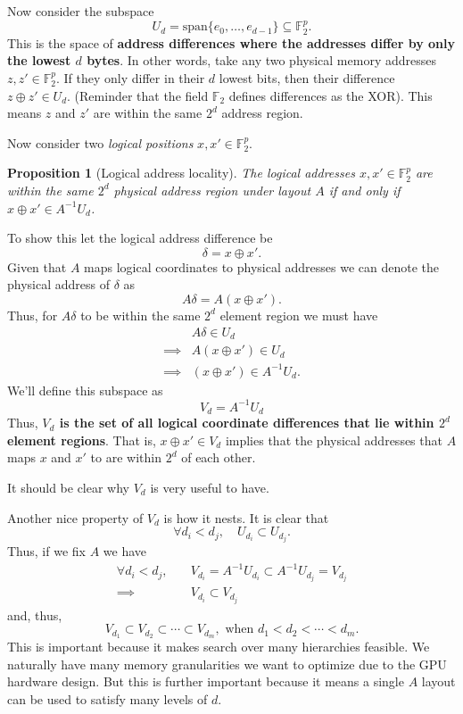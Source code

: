 \documentclass[10pt]{article}
\newtheorem{prop}{Proposition}
\theoremstyle{remark}
\begin{document}
Now consider the subspace
%
\[
U_d = \mathrm{span}\{e_0,\ldots,e_{d-1}\} \subseteq \mathbb{F}_2^p.
\]
%
This is the space of {\bf address differences where the addresses differ by only the lowest $d$ bytes}.
In other words, take any two physical memory addresses $z, z' \in \mathbb{F}_2^p$.
If they only differ in their $d$ lowest bits, then their difference $z \oplus z' \in U_d$.
(Reminder that the field $\mathbb{F}_2$ defines differences as the XOR).
This means $z$ and $z'$ are within the same $2^d$ address region.

Now consider two \emph{logical positions} $x,x' \in \mathbb{F}_2^p$. 

\begin{prop}[Logical address locality]
The logical addresses $x,x' \in \mathbb{F}_2^p$ are within the same $2^d$ physical address region under layout $A$ if and only if $x \oplus x' \in A^{-1} U_d$.
\end{prop}

To show this let the logical address difference be
\[
\delta = x \oplus x'.
\]
Given that $A$ maps logical coordinates to physical addresses we can denote the physical address of $\delta$ as
\[
A\delta = A(x \oplus x').
\]
Thus, for $A\delta$ to be within the same $2^d$ element region we must have
%
\begin{align*}
    & A\delta \in U_d \\    
    \implies & A(x \oplus x') \in U_d \\
    \implies & (x \oplus x') \in A^{-1} U_d.
\end{align*}
%
We'll define this subspace as
%
\[
V_d = A^{-1} U_d
\]
%
Thus, {\bf $V_d$ is the set of all logical coordinate differences that lie within $2^d$ element regions}.
That is, $x \oplus x' \in V_d$ implies that the physical addresses that $A$ maps $x$ and $x'$ to are within $2^d$ of each other.

It should be clear why $V_d$ is very useful to have.

Another nice property of $V_d$ is how it nests. It is clear that
\[
\forall d_i < d_j,\quad U_{d_i} \subset U_{d_j}.
\]
Thus, if we fix $A$ we have
%
\begin{align*}
    \forall d_i < d_j, \quad & V_{d_i} = A^{-1} U_{d_i} \subset A^{-1} U_{d_j} = V_{d_j} \\
    \implies & V_{d_i} \subset V_{d_j}
\end{align*}
%
and, thus,
\[
V_{d_1} \subset V_{d_2} \subset \cdots \subset V_{d_m}, \,\, \textrm{when } d_1 < d_2 < \cdots < d_m.
\]
%
This is important because it makes search over many hierarchies feasible. We naturally have many memory granularities we want to optimize due to the GPU hardware design.
But this is further important because it means a single $A$ layout can be used to satisfy many levels of $d$.
\end{document}
